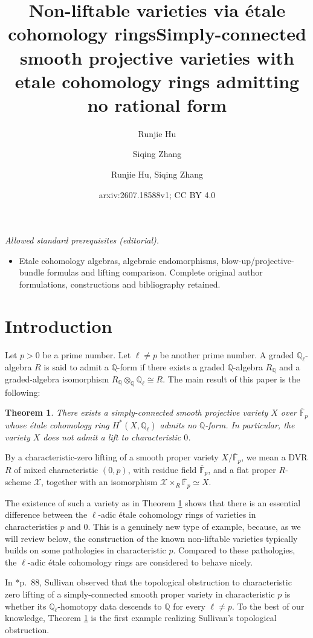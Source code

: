 \documentclass[11pt, reqno]{amsart}
\title{Non-liftable varieties via \'etale cohomology rings}
\author{Runjie Hu}
\author{Siqing Zhang}
\date{}
\title{Simply-connected smooth projective varieties with etale cohomology rings admitting no rational form}
\author{Runjie Hu, Siqing Zhang}
\date{arxiv:2607.18588v1; CC BY 4.0}
\newtheorem{theorem}{Theorem}[section]
\theoremstyle{definition}
\newcommand\QQ{\mathbb{Q}}
\newcommand\FF{\mathbb{F}}
\begin{document}
\maketitle
\noindent\textit{Allowed standard prerequisites (editorial).}\begin{itemize}
\item Etale cohomology algebras, algebraic endomorphisms, blow-up/projective-bundle formulas and lifting comparison. Complete original author formulations, constructions and bibliography retained.
\end{itemize}\medskip
\section*{Introduction}

Let $p>0$ be a prime number. Let $\ell\neq p$ be another prime number.
A graded $\QQ_\ell$-algebra $R$ is said to admit a $\QQ$-form if there
exists a graded $\QQ$-algebra $R_{\QQ}$ and a graded-algebra isomorphism $R_{\QQ}\otimes_{\QQ}\QQ_\ell\cong R$.
The main result of this paper is the following:


\begin{theorem}\label{thm:main-intro}
    There exists a simply-connected smooth projective variety $X$ over $\overline{\FF}_p$ whose \'etale cohomology ring $H^*(X,\QQ_{\ell})$ admits no $\QQ$-form.
In particular, the variety $X$ does not admit a lift to characteristic $0$.
\end{theorem}


By a characteristic-zero lifting of a smooth proper variety
$X/\overline{\FF}_p$, we mean a DVR $R$ of mixed characteristic $(0,p)$, with
residue field $\overline{\FF}_p$, and a flat proper $R$-scheme $\mathcal X$, together with an isomorphism
$\mathcal X\times_R\overline{\FF}_p \simeq X$.

The existence of such a variety as in Theorem \ref{thm:main-intro} shows that there is an essential difference between the $\ell$-adic \'etale cohomology rings of varieties in characteristics $p$ and $0$.  This is a genuinely new type of example, because, as we will review below, the construction of the known non-liftable varieties typically builds on some pathologies in characteristic $p$.
Compared to these pathologies, the $\ell$-adic \'etale cohomology rings are considered to behave nicely. 

In \cite{Sullivan-MIT-notes}*{p.~88}, Sullivan observed that the topological obstruction to characteristic zero lifting of a simply-connected smooth proper variety in characteristic $p$ is whether its $\QQ_{\ell}$-homotopy data descends to $\QQ$ for every $\ell\neq p$. To the best of our knowledge, Theorem \ref{thm:main-intro} is the first example realizing Sullivan's topological obstruction.
\end{document}
